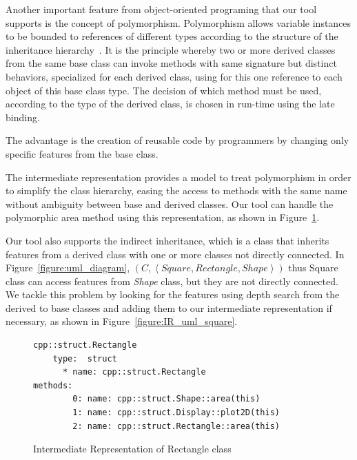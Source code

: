 \documentclass[a4paper]{llncs}
\begin{document}
Another important feature from object-oriented programing that our tool
supports is the concept of polymorphism. Polymorphism allows variable instances to be
bounded to references of different types according to the structure of the
inheritance hierarchy~\cite{Alexander02}.
It is the principle whereby two or more derived classes from the same base
class can invoke methods with same signature but distinct behaviors, specialized
for each derived class, using for this one reference to each object of this base class type.
The decision of which method must be used, according to the type of the
derived class, is chosen in run-time using the late binding.

The advantage is the creation of reusable code by programmers by changing only
specific features from the base class.

The intermediate representation provides a model to treat polymorphism in
order to simplify the class hierarchy,
easing the access to methods with the same name without ambiguity between
base and derived classes.
Our tool can handle the polymorphic area method using this representation,
as shown in Figure~\ref{figure:IR_uml_rec}.

Our tool also supports the indirect inheritance, which is a class that
inherits features from a derived class with one or more classes
not directly connected. In Figure~\ref{figure:uml_diagram}, \linebreak
$\left(C, \left\langle Square, Rectangle, Shape \right\rangle \right)$
thus Square class can access features from \textit{Shape} class,
but they are not directly connected. We tackle this problem by
looking for the features using depth search from the derived to base classes
and adding them to our intermediate representation if necessary,
as shown in Figure~\ref{figure:IR_uml_square}.


\begin{figure}[h]
\centering
\begin{minipage}{0.9\textwidth}
\begin{lstlisting}[style=nonumbers]
cpp::struct.Rectangle
    type:  struct
      * name: cpp::struct.Rectangle
methods:
        0: name: cpp::struct.Shape::area(this)
        1: name: cpp::struct.Display::plot2D(this)
        2: name: cpp::struct.Rectangle::area(this)
\end{lstlisting}
\end{minipage}
\caption{Intermediate Representation of Rectangle class}
\label{figure:IR_uml_rec}
\end{figure}
\end{document}
